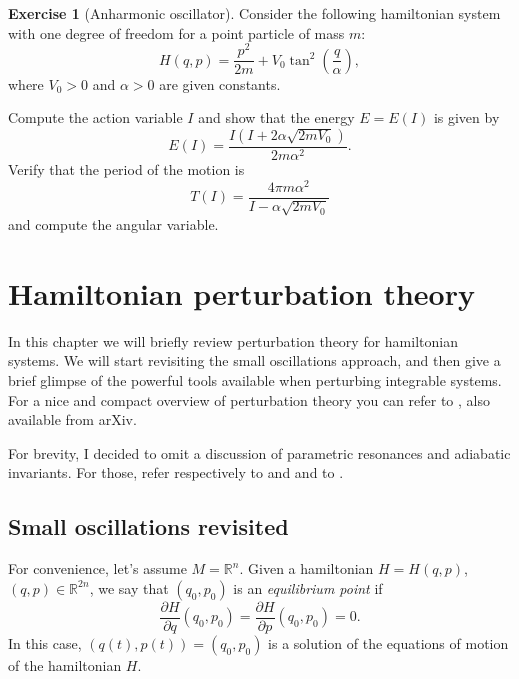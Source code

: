 \documentclass[english,fontsize=11pt,paper=b5]{scrbook}
\theoremstyle{definition}
\newtheorem{exercise}{Exercise}[chapter]
\begin{document}
      \begin{exercise}[Anharmonic oscillator]
        Consider the following hamiltonian system with one degree of freedom for a point particle of mass $m$:
        \begin{equation}
          H(q,p) = \frac{p^2}{2m} + V_0 \tan^2\left(\frac{q}{\alpha}\right),
        \end{equation}
        where $V_0>0$ and $\alpha>0$ are given constants.

        Compute the action variable $I$ and show that the energy $E = E(I)$ is given by
        \begin{equation}
          E(I) = \frac{I (I + 2\alpha\sqrt{2m V_0})}{2m\alpha^2}.
        \end{equation}
        Verify that the period of the motion is
        \begin{equation}
          T(I) = \frac{4 \pi m \alpha^2}{I - \alpha \sqrt{2mV_0}}
        \end{equation}
        and compute the angular variable.
      \end{exercise}


      \chapter{Hamiltonian perturbation theory}

      In this chapter we will briefly review perturbation theory for hamiltonian systems.
      We will start revisiting the small oscillations approach, and then give a brief glimpse of the powerful tools available when perturbing integrable systems.
      For a nice and compact overview of perturbation theory you can refer to \cite{Celletti_2009}, also available from arXiv.

      For brevity, I decided to omit a discussion of parametric resonances and adiabatic invariants.
      For those, refer respectively to \cite[Chapter 25]{book:arnold} and \cite[Chapter 5.4]{book:knauf} and to \cite[Chapter 15.1]{book:knauf}.

      \section{Small oscillations revisited}
      For convenience, let's assume $M=\mathbb{R}^n$.
      Given a hamiltonian $H=H(q,p)$, $(q,p)\in\mathbb{R}^{2n}$, we say that $(q_0, p_0)$ is an \emph{equilibrium point} if
      \begin{equation}
        \frac{\partial H}{\partial q}(q_0, p_0) = \frac{\partial H}{\partial p}(q_0, p_0) = 0.
      \end{equation}
      In this case, $(q(t), p(t)) = (q_0, p_0)$ is a solution of the equations of motion of the hamiltonian $H$.
\end{document}
